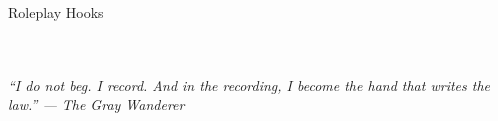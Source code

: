 \documentclass[10pt]{article}
\begin{document}
\begin{minipage}[t]{0.48\linewidth}
    \vspace{0.5em}
    
    \begin{charbox}{Roleplay Hooks}
        \underline{\hspace{8cm}}\\
        \underline{\hspace{8cm}}\\
        \underline{\hspace{8cm}}\\
    \end{charbox}
\end{minipage}

\vspace{1em}
\begin{center}
    {\small\sffamily\itshape ``I do not beg. I record. And in the recording, I become the hand that writes the law.'' --- The Gray Wanderer}
\end{center}
\end{document}
